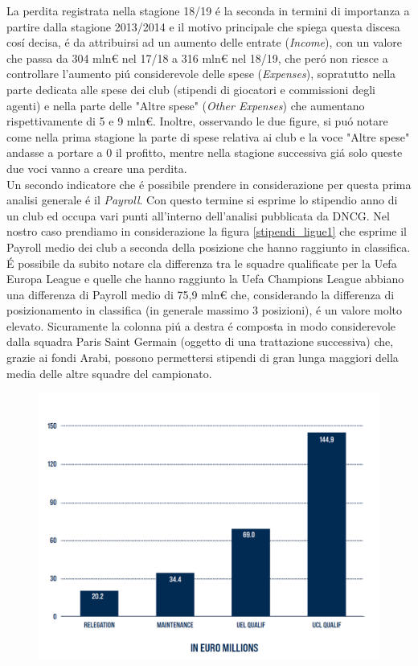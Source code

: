 \documentclass[
    corpo=11.5pt,
    oneside,
    evenboxes,
    tipotesi=triennale,
    stile=classica,
    oldstyle,
    autoretitolo,
    greek,
]{toptesi}
\begin{document}
\begin{interlinea}{1.5}
La perdita registrata nella stagione 18/19 \'e la seconda in termini di importanza a partire dalla stagione 2013/2014 e
il motivo principale che spiega questa discesa cos\'i decisa, \'e da attribuirsi ad un aumento delle entrate (\emph{Income}),
con un valore che passa da 304 mln€ nel 17/18 a 316 mln€ nel 18/19, che per\'o non riesce a controllare l'aumento pi\'u considerevole
delle spese (\emph{Expenses}), sopratutto nella parte dedicata alle spese dei club (stipendi di giocatori e commissioni degli agenti) 
e nella parte delle "Altre spese" (\emph{Other Expenses}) che aumentano rispettivamente di 5 e 9 mln€. Inoltre, osservando le due figure,
si pu\'o notare come nella prima stagione la parte di spese relativa ai club e la voce "Altre spese" andasse a portare a 0 il profitto,
mentre nella stagione successiva gi\'a solo queste due voci vanno a creare una perdita.\\
Un secondo indicatore che \'e possibile prendere in considerazione per questa prima analisi generale \'e il \emph{Payroll}. Con questo termine
si esprime lo stipendio anno di un club ed occupa vari punti all'interno dell'analisi pubblicata da DNCG. Nel nostro caso prendiamo 
in considerazione la figura \ref{stipendi_ligue1} che esprime il Payroll medio dei club a seconda della posizione che hanno raggiunto
in classifica. \'E possibile da subito notare cla differenza tra le squadre qualificate per la Uefa Europa League e quelle che hanno
raggiunto la Uefa Champions League abbiano una differenza di Payroll medio di 75,9 mln€ che, considerando la differenza di posizionamento 
in classifica (in generale massimo 3 posizioni), \'e un valore molto elevato. Sicuramente la colonna pi\'u a destra \'e composta in modo
considerevole dalla squadra Paris Saint Germain (oggetto di una trattazione successiva) che, grazie ai fondi Arabi, possono permettersi
stipendi di gran lunga maggiori della media delle altre squadre del campionato.
\begin{figure}
    \includegraphics[scale=.5]{img/stipendi_ligue1.png}

\end{figure}
\end{interlinea}
\end{document}
